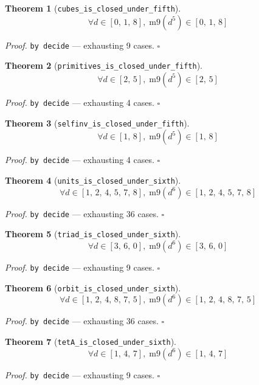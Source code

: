 \documentclass[11pt]{article}
\newtheorem{theorem}{Theorem}[section]
\begin{document}
\begin{theorem}[\texttt{cubes\_is\_closed\_under\_fifth}]
\[ \forall d \in [0,\,1,\,8],\; \mathrm{m9}\mathopen{}\left(d^{5}\right) \in [0,\,1,\,8] \]
\end{theorem}
\noindent\emph{Proof.} \texttt{by decide} --- exhausting 9 cases. \hfill$\square$

\begin{theorem}[\texttt{primitives\_is\_closed\_under\_fifth}]
\[ \forall d \in [2,\,5],\; \mathrm{m9}\mathopen{}\left(d^{5}\right) \in [2,\,5] \]
\end{theorem}
\noindent\emph{Proof.} \texttt{by decide} --- exhausting 4 cases. \hfill$\square$

\begin{theorem}[\texttt{selfinv\_is\_closed\_under\_fifth}]
\[ \forall d \in [1,\,8],\; \mathrm{m9}\mathopen{}\left(d^{5}\right) \in [1,\,8] \]
\end{theorem}
\noindent\emph{Proof.} \texttt{by decide} --- exhausting 4 cases. \hfill$\square$

\begin{theorem}[\texttt{units\_is\_closed\_under\_sixth}]
\[ \forall d \in [1,\,2,\,4,\,5,\,7,\,8],\; \mathrm{m9}\mathopen{}\left(d^{6}\right) \in [1,\,2,\,4,\,5,\,7,\,8] \]
\end{theorem}
\noindent\emph{Proof.} \texttt{by decide} --- exhausting 36 cases. \hfill$\square$

\begin{theorem}[\texttt{triad\_is\_closed\_under\_sixth}]
\[ \forall d \in [3,\,6,\,0],\; \mathrm{m9}\mathopen{}\left(d^{6}\right) \in [3,\,6,\,0] \]
\end{theorem}
\noindent\emph{Proof.} \texttt{by decide} --- exhausting 9 cases. \hfill$\square$

\begin{theorem}[\texttt{orbit\_is\_closed\_under\_sixth}]
\[ \forall d \in [1,\,2,\,4,\,8,\,7,\,5],\; \mathrm{m9}\mathopen{}\left(d^{6}\right) \in [1,\,2,\,4,\,8,\,7,\,5] \]
\end{theorem}
\noindent\emph{Proof.} \texttt{by decide} --- exhausting 36 cases. \hfill$\square$

\begin{theorem}[\texttt{tetA\_is\_closed\_under\_sixth}]
\[ \forall d \in [1,\,4,\,7],\; \mathrm{m9}\mathopen{}\left(d^{6}\right) \in [1,\,4,\,7] \]
\end{theorem}
\noindent\emph{Proof.} \texttt{by decide} --- exhausting 9 cases. \hfill$\square$
\end{document}
